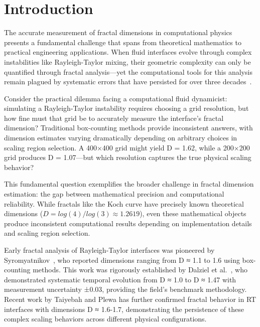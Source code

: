 \documentclass[preprint,12pt]{elsarticle}
\def\log{log}%
\begin{document}

\section{Introduction}
\label{sec:introduction}

The accurate measurement of fractal dimensions in computational physics presents a fundamental challenge that spans from theoretical mathematics to practical engineering applications. When fluid interfaces evolve through complex instabilities like Rayleigh-Taylor mixing, their geometric complexity can only be quantified through fractal analysis—yet the computational tools for this analysis remain plagued by systematic errors that have persisted for over three decades~\cite{liebovitch1989,bouda2016}.

Consider the practical dilemma facing a computational fluid dynamicist: simulating a Rayleigh-Taylor instability requires choosing a grid resolution, but how fine must that grid be to accurately measure the interface's fractal dimension? Traditional box-counting methods provide inconsistent answers, with dimension estimates varying dramatically depending on arbitrary choices in scaling region selection. A 400×400 grid might yield D = 1.62, while a 200×200 grid produces D = 1.07—but which resolution captures the true physical scaling behavior?

This fundamental question exemplifies the broader challenge in fractal dimension estimation: the gap between mathematical precision and computational reliability. While fractals like the Koch curve have precisely known theoretical dimensions ($D = \log(4)/\log(3) \approx 1.2619$), even these mathematical objects produce inconsistent computational results depending on implementation details and scaling region selection.

Early fractal analysis of Rayleigh-Taylor interfaces was pioneered by Syromyatnikov~\cite{syromyatnikov1993}, who reported dimensions ranging from D ≈ 1.1 to 1.6 using box-counting methods. This work was rigorously established by Dalziel et al.~\cite{dalziel1999}, who demonstrated systematic temporal evolution from D ≈ 1.0 to D ≈ 1.47 with measurement uncertainty ±0.03, providing the field's benchmark methodology. Recent work by Taiyebah and Plewa has further confirmed fractal behavior in RT interfaces with dimensions D ≈ 1.6-1.7, demonstrating the persistence of these complex scaling behaviors across different physical configurations.
\end{document}
